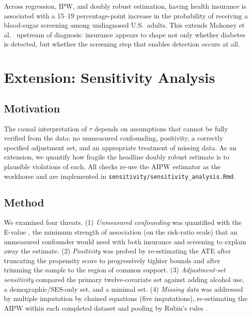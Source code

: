 \documentclass[12pt]{article}
\begin{document}
Across regression, IPW, and doubly robust estimation, having health insurance is
associated with a 15--19 percentage-point increase in the probability of
receiving a blood-sugar screening among undiagnosed U.S.\ adults. This extends
Mahoney et al.\ \cite{mahoney2020} upstream of diagnosis: insurance appears to
shape not only whether diabetes is detected, but whether the screening step that
enables detection occurs at all.

\section{Extension: Sensitivity Analysis} \label{sec:Extension}

\subsection{Motivation} \label{subsec:ExtMotivation}

The causal interpretation of $\tau$ depends on assumptions that cannot be fully
verified from the data: no unmeasured confounding, positivity, a correctly
specified adjustment set, and an appropriate treatment of missing data. As an
extension, we quantify how fragile the headline doubly robust estimate is to
plausible violations of each. All checks re-use the AIPW estimator as the
workhorse and are implemented in \texttt{sensitivity/sensitivity\_analysis.Rmd}.

\subsection{Method} \label{subsec:ExtMethod}

We examined four threats. (1) \emph{Unmeasured confounding} was quantified with
the E-value \cite{vanderweele2017}, the minimum strength of association (on the
risk-ratio scale) that an unmeasured confounder would need with both insurance
and screening to explain away the estimate. (2) \emph{Positivity} was probed by
re-estimating the ATE after truncating the propensity score to progressively
tighter bounds and after trimming the sample to the region of common support.
(3) \emph{Adjustment-set sensitivity} compared the primary twelve-covariate set
against adding alcohol use, a demographic/SES-only set, and a minimal set.
(4) \emph{Missing data} was addressed by multiple imputation by chained
equations (five imputations), re-estimating the AIPW within each completed
dataset and pooling by Rubin's rules \cite{rubin1987}.
\end{document}
